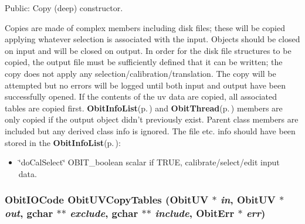 Public: Copy (deep) constructor. 

Copies are made of complex members including disk files; these will be copied applying whatever selection is associated with the input. Objects should be closed on input and will be closed on output. In order for the disk file structures to be copied, the output file must be sufficiently defined that it can be written; the copy does not apply any selection/calibration/translation. The copy will be attempted but no errors will be logged until both input and output have been successfully opened. If the contents of the uv data are copied, all associated tables are copied first. {\bf Obit\-Info\-List}{\rm (p.\,\pageref{structObitInfoList})} and {\bf Obit\-Thread}{\rm (p.\,\pageref{structObitThread})} members are only copied if the output object didn't previously exist. Parent class members are included but any derived class info is ignored. The file etc. info should have been stored in the {\bf Obit\-Info\-List}{\rm (p.\,\pageref{structObitInfoList})}: \begin{itemize}
\item \char`\"{}do\-Cal\-Select\char`\"{} OBIT\_\-boolean scalar if TRUE, calibrate/select/edit input data. 
\end{itemize}
\subsubsection{\setlength{\rightskip}{0pt plus 5cm}Obit\-IOCode Obit\-UVCopy\-Tables ({\bf Obit\-UV} $\ast$ {\em in}, {\bf Obit\-UV} $\ast$ {\em out}, gchar $\ast$$\ast$ {\em exclude}, gchar $\ast$$\ast$ {\em include}, {\bf Obit\-Err} $\ast$ {\em err})}\label{ObitUV_8h_a47}


